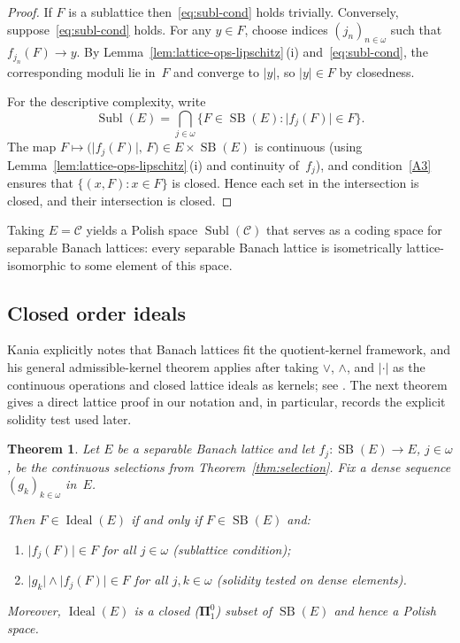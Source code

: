 \documentclass[12pt]{amsart}
\theoremstyle{plain}
\newtheorem{theorem}{Theorem}[section]
\theoremstyle{definition}
\theoremstyle{remark}
\DeclareMathOperator{\SB}{SB}
\DeclareMathOperator{\Subl}{Subl}
\DeclareMathOperator{\Ideal}{Ideal}
\begin{document}
\begin{proof}
If $F$ is a sublattice then~\eqref{eq:subl-cond} holds trivially.  Conversely,
suppose~\eqref{eq:subl-cond} holds.  For any $y \in F$, choose indices
$(j_n)_{n \in \omega}$ such that $f_{j_n}(F) \to y$.  By
Lemma~\ref{lem:lattice-ops-lipschitz}\,(i) and~\eqref{eq:subl-cond}, the
corresponding moduli lie in~$F$ and converge to $\lvert y \rvert$, so
$\lvert y \rvert \in F$ by closedness.

For the descriptive complexity, write
\[
    \Subl(E) = \bigcap_{j \in \omega}
    \bigl\{F \in \SB(E) \colon \lvert f_j(F) \rvert \in F\bigr\}.
\]
The map $F \mapsto \bigl(\lvert f_j(F) \rvert,\, F\bigr) \in E \times \SB(E)$
is continuous (using Lemma~\ref{lem:lattice-ops-lipschitz}\,(i) and continuity
of~$f_j$), and condition~\ref{A3} ensures that
$\{(x, F) \colon x \in F\}$ is closed.  Hence each set in the intersection is
closed, and their intersection is closed.
\end{proof}

Taking $E = \mathcal{C}$ yields a Polish space
$\Subl(\mathcal{C})$ that serves as a coding space for
separable Banach lattices: every separable Banach lattice is isometrically
lattice-isomorphic to some element of this space.

\subsection{Closed order ideals}\label{subsec:ideal}

Kania explicitly notes that Banach lattices fit the quotient-kernel framework,
and his general admissible-kernel theorem applies after taking \(\vee\),
\(\wedge\), and \(|\cdot|\) as the continuous operations and closed lattice ideals
as kernels; see \cite[Remark~3.5 and Proposition~3.6]{Kan2026Pol}.  The next
theorem gives a direct lattice proof in our notation and, in particular, records
the explicit solidity test used later.

\begin{theorem}\label{thm:ideal}
Let $E$ be a separable Banach lattice and let
$f_j \colon \SB(E) \to E$, $j \in \omega$, be the continuous selections from
Theorem~\ref{thm:selection}.  Fix a dense sequence $(g_k)_{k \in \omega}$
in~$E$.

Then $F \in \Ideal(E)$ if and only if $F \in \SB(E)$ and:
\begin{enumerate}[label=\textup{(I\arabic*)}]
    \item\label{I1} $\lvert f_j(F) \rvert \in F$ for all $j \in \omega$
      \quad\textup{(}sublattice condition\textup{)};
    \item\label{I2} $\lvert g_k \rvert \wedge \lvert f_j(F) \rvert \in F$
      for all $j, k \in \omega$
      \quad\textup{(}solidity tested on dense elements\textup{)}.
\end{enumerate}
Moreover, $\Ideal(E)$ is a closed ($\boldsymbol{\Pi}^0_1$) subset of $\SB(E)$
and hence a Polish space.
\end{theorem}
\end{document}
